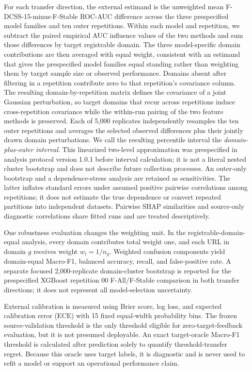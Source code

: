 \documentclass[
  10pt,
]{article}
\begin{document}
For each transfer direction, the external estimand is the unweighted
mean F-DCSS-15-minus-F-Stable ROC-AUC difference across the three
prespecified model families and ten outer repetitions. Within each model
and repetition, we subtract the paired empirical AUC influence values of
the two methods and sum those differences by target registrable domain.
The three model-specific domain contributions are then averaged with
equal weight, consistent with an estimand that gives the prespecified
model families equal standing rather than weighting them by target
sample size or observed performance. Domains absent after filtering in a
repetition contribute zero to that repetition's covariance column. The
resulting domain-by-repetition matrix defines the covariance of a joint
Gaussian perturbation, so target domains that recur across repetitions
induce cross-repetition covariance while the within-run pairing of the
two feature methods is preserved. Each of 5,000 replicates independently
resamples the ten outer repetitions and averages the selected observed
differences plus their jointly drawn domain perturbations. We call the
resulting percentile interval the \emph{domain-plus-outer interval}.
This linearized two-level approximation was prespecified in analysis
protocol version 1.0.1 before interval calculation; it is not a literal
nested cluster bootstrap and does not describe future collection
processes. An outer-only bootstrap and a dependence-stress analysis are
retained as sensitivities. The latter inflates standard errors under
assumed positive pairwise correlations among repetitions; it does not
estimate the true dependence or convert repeated partitions into
independent datasets. Pairwise SHAP similarities and source-only
diagnostic correlations share fitted runs and are treated descriptively.

One robustness evaluation changes the weighting unit. In the
registrable-domain-equal analysis, every domain contributes total weight
one, and each URL in domain \(g\) receives weight \(w_i=1/n_g\).
Weighted confusion components yield domain-equal Macro-F1, balanced
accuracy, recall, and false-positive rate. A separate focused
2,000-replicate domain-cluster bootstrap is reported for the
prespecified XGBoost repetition 00 F-All/F-Stable comparison in both
transfer directions; it does not represent all model-selection
uncertainty.

External calibration is measured using Brier score, log loss, and
expected calibration error (ECE) with 15 fixed equal-width probability
bins. The frozen source-validation threshold is the only threshold
eligible for zero-target-feedback evaluation, but it is not presumed
deployable. An exact target-oracle Macro-F1 threshold is calculated
after prediction solely to quantify threshold-transfer regret. Because
this oracle uses target labels, it is diagnostic and is never used to
refit a model or support an operational performance claim.
\end{document}
